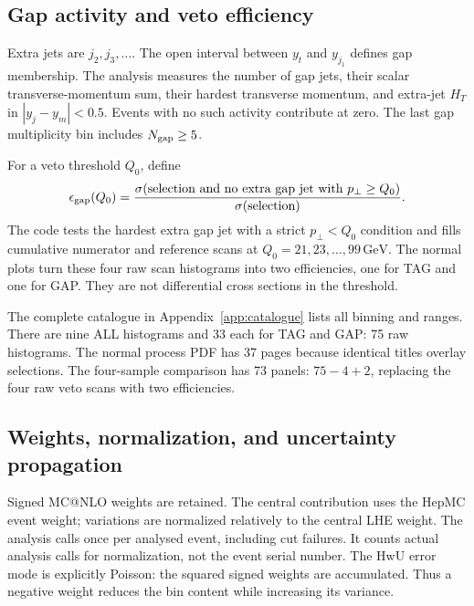 \documentclass[11pt,a4paper]{article}
\newcommand{\code}[1]{\texttt{\detokenize{#1}}}
\newcommand{\GeV}{\,\mathrm{GeV}}
\begin{document}
\subsection{Gap activity and veto efficiency}

Extra jets are $j_2,j_3,\ldots$. The open interval between $y_t$ and
$y_{j_1}$ defines gap membership. The analysis measures the number of gap
jets, their scalar transverse-momentum sum, their hardest transverse
momentum, and extra-jet $H_T$ in $|y_j-y_m|<0.5$. Events with no such activity
contribute at zero. The last gap multiplicity bin includes $N_{\rm gap}\geq5$.

For a veto threshold $Q_0$, define
\begin{equation}
 \epsilon_{\rm gap}(Q_0)
 =\frac{\sigma(\text{selection and no extra gap jet with }p_\perp\geq Q_0)}
        {\sigma(\text{selection})}.
\end{equation}
The code tests the hardest extra gap jet with a strict $p_\perp<Q_0$
condition and fills cumulative numerator and reference scans at
$Q_0=21,23,\ldots,99\GeV$. The normal plots turn these four raw scan
histograms into two efficiencies, one for TAG and one for GAP. They are
not differential cross sections in the threshold.

The complete catalogue in Appendix~\ref{app:catalogue} lists all binning and
ranges. There are nine ALL histograms and 33 each for TAG and GAP: 75 raw
histograms. The normal process PDF has 37 pages because identical titles
overlay selections. The four-sample comparison has 73 panels:
$75-4+2$, replacing the four raw veto scans with two efficiencies.

\subsection{Weights, normalization, and uncertainty propagation}\label{sec:statistics}

Signed MC@NLO weights are retained. The central contribution uses the
HepMC event weight; variations are normalized relatively to the central
LHE weight. The analysis calls \code{HwU_add_points} once per analysed event,
including cut failures. It counts actual analysis calls for normalization,
not the event serial number. The HwU error mode is explicitly Poisson:
the squared signed weights are accumulated. Thus a negative weight reduces
the bin content while increasing its variance.
\end{document}
